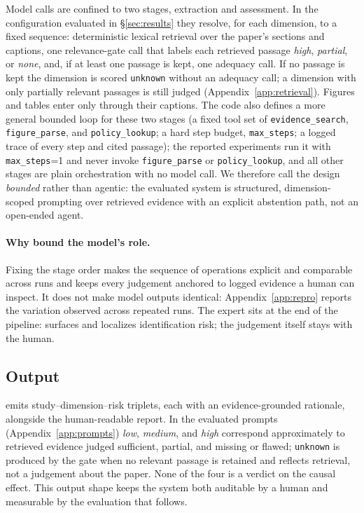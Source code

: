 Model calls are confined to two stages, extraction and assessment. In the
configuration evaluated in \S\ref{sec:results} they resolve, for each
dimension, to a fixed sequence: deterministic lexical retrieval over the
paper's sections and captions, one relevance-gate call that labels each
retrieved passage \emph{high}, \emph{partial}, or \emph{none}, and, if at least
one passage is kept, one adequacy call. If no passage is kept the dimension is
scored \texttt{unknown} without an adequacy call; a dimension with only
partially relevant passages is still judged (Appendix~\ref{app:retrieval}).
Figures and tables enter only through their captions. The code also defines a
more general bounded loop for these two stages (a fixed tool set of
\texttt{evidence\_search}, \texttt{figure\_parse}, and
\texttt{policy\_lookup}; a hard step budget, \texttt{max\_steps}; a logged
trace of every step and cited passage); the reported experiments run it with
\texttt{max\_steps}{=}1 and never invoke \texttt{figure\_parse} or
\texttt{policy\_lookup}, and all other stages are plain orchestration with
no model call. We therefore call the design
\emph{bounded} rather than agentic: the evaluated system is structured,
dimension-scoped prompting over retrieved evidence with an explicit abstention
path, not an open-ended agent.

\paragraph{Why bound the model's role.}
Fixing the stage order makes the sequence of operations explicit and comparable
across runs and keeps every judgement anchored to logged evidence a human can
inspect. It does not make model outputs identical: Appendix~\ref{app:repro}
reports the variation observed across repeated runs. The expert sits at the end
of the pipeline: \sys{} surfaces and localizes identification risk; the
judgement itself stays with the human.

\subsection{Output}
\sys{} emits study--dimension--risk triplets, each with an
evidence-grounded rationale, alongside the human-readable report. In the
evaluated prompts (Appendix~\ref{app:prompts}) \emph{low}, \emph{medium},
and \emph{high} correspond approximately to retrieved evidence judged
sufficient, partial, and missing or flawed; \texttt{unknown} is produced by the
gate when no relevant passage is retained and reflects retrieval, not a
judgement about the paper. None of the four is a verdict on the causal effect. This
output shape keeps the system both auditable by a human and measurable by the
evaluation that follows.

